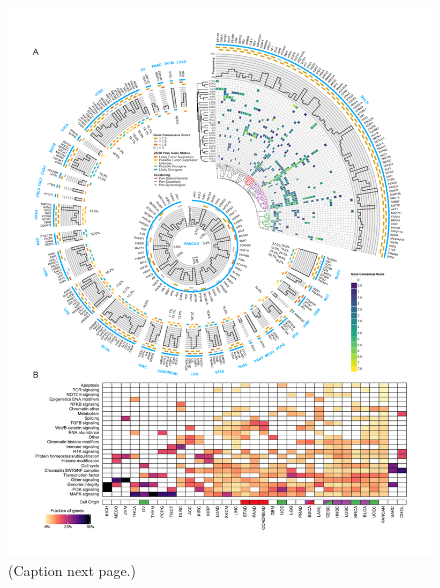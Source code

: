 \begin{figure}
  \centering
  \makeatletter
  \let\@currsize\normalsize
  \includegraphics[width=\linewidth]{figures/chapter7/cancer_driver_genes.pdf}
  \caption[Cancer driver gene discovery]{(Caption next page.)}
  \label{fig:gene_discovery}
\end{figure}
\addtocounter{figure}{-1}
